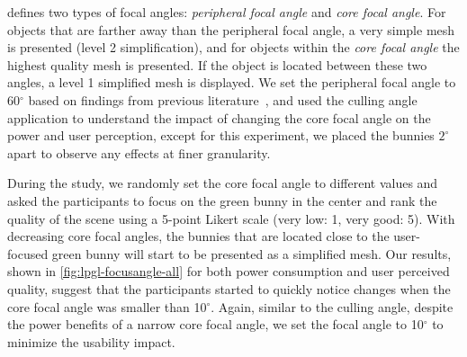 {\myit} defines two types of focal angles: \textit{peripheral focal angle} and \textit{core focal angle}. For objects that are farther away
than the peripheral focal angle, a very simple mesh is presented 
(level 2 simplification), and for objects within the \textit{core focal angle} 
the highest quality mesh is presented. If the object is located between these two angles, a level 1 simplified mesh is displayed. We set the peripheral focal angle to 60$^\circ$ based on findings from previous literature~\cite{Grosvenor07, Bhise11}, and used the culling angle application to understand the impact of changing the core focal angle on the power and user perception, except for this experiment, we placed the bunnies $2^\circ$ apart to observe any effects at  finer granularity.


During the study, we randomly set the core focal angle to different values and asked the participants to focus on the green bunny in the center and rank the quality of the scene using a 5-point Likert scale (very low: 1, very good: 5). With decreasing core focal angles, the bunnies that are located close to the user-focused green bunny will start to be presented as a simplified mesh. Our results, shown in \fig\ref{fig:lpgl-focusangle-all} for both power consumption and user perceived quality, suggest that the participants started to quickly notice changes when the core focal angle was smaller than 10$^\circ$. Again, similar to the culling angle, despite the power benefits of a narrow core focal angle, we set the focal angle to 10$^\circ$ to minimize the usability impact.


%
%

%
%




